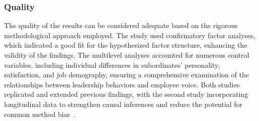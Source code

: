 \documentclass[runningheads]{llncs}
\begin{document}
\subsubsection{Quality}
The quality of the results can be considered adequate based on the rigorous methodological approach employed. The study used confirmatory factor analyses, which indicated a good fit for the hypothesized factor structure, enhancing the validity of the findings. The multilevel analyses accounted for numerous control variables, including individual differences in subordinates' personality, satisfaction, and job demography, ensuring a comprehensive examination of the relationships between leadership behaviors and employee voice. Both studies replicated and extended previous findings, with the second study incorporating longitudinal data to strengthen causal inferences and reduce the potential for common method bias~\cite{detert2007leadership}.
\end{document}
